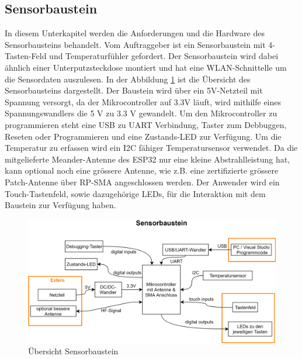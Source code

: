 \subsection{Sensorbaustein}\label{subsec: Sensorbaustein}
\label{sec: Sensorbaustein}
In diesem Unterkapitel werden die Anforderungen und die Hardware des Sensorbausteins behandelt.
Vom Auftraggeber ist ein Sensorbaustein mit 4-Tasten-Feld und Temperaturfühler gefordert. Der Sensorbaustein wird dabei ähnlich einer Unterputzsteckdose montiert und hat eine WLAN-Schnittelle um die Sensordaten auszulesen. In der Abbildung \ref{pic: Uebersicht_Sensorbaustein} ist die Übersicht des Sensorbausteins dargestellt. Der Baustein wird über ein 5V-Netzteil mit Spannung versorgt, da der Mikrocontroller auf 3.3V läuft, wird mithilfe eines Spannungswandlers die 5 V zu 3.3 V gewandelt. Um den Mikrocontroller zu programmieren steht eine USB zu UART Verbindung, Taster zum Debbuggen, Reseten oder Programmieren und eine Zustands-LED zur Verfügung. Um die Temperatur zu erfassen wird ein I2C fähiger Temperatursensor verwendet. Da die mitgelieferte Meander-Antenne des ESP32 nur eine kleine Abstrahlleistung hat, kann optional noch eine grössere Antenne, wie z.B. eine zertifizierte grössere Patch-Antenne über RP-SMA angeschlossen werden. Der Anwender wird ein Touch-Tastenfeld, sowie dazugehörige LEDs, für die Interaktion mit dem Baustein zur Verfügung haben.  

\begin{figure}[H]
	\centering
	\includegraphics[width=\textwidth]{graphics/Sensorbaustein.png}
	\caption{Übersicht Sensorbaustein}
	\label{pic: Uebersicht_Sensorbaustein}
\end{figure} 

